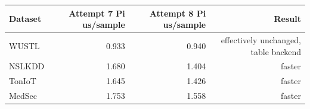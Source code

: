 \begin{tabular}{lrrr}
\toprule
Dataset & Attempt 7 Pi us/sample & Attempt 8 Pi us/sample & Result \\
\midrule
WUSTL & 0.933 & 0.940 & effectively unchanged, table backend \\
NSLKDD & 1.680 & 1.404 & faster \\
TonIoT & 1.645 & 1.426 & faster \\
MedSec & 1.753 & 1.558 & faster \\
\bottomrule
\end{tabular}
